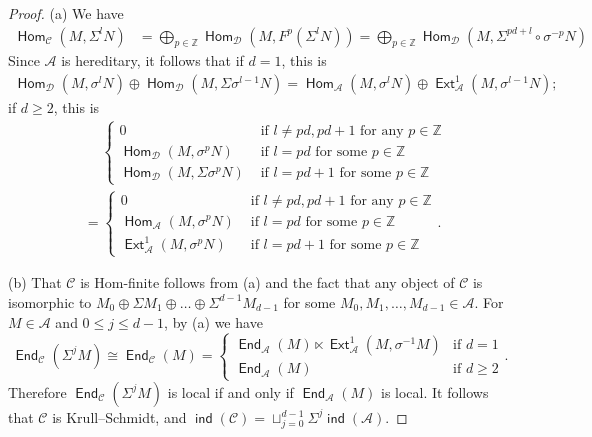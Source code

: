 \documentclass[reqno,12pt,a4paper]{amsart}
\theoremstyle{remark}
\theoremstyle{definition}
\newcommand{\opname}[1]{\operatorname{\mathsf{#1}}}
\newcommand{\ind}{\opname{ind}}
\newcommand{\Hom}{\opname{Hom}}
\newcommand{\End}{\opname{End}}
\newcommand{\Ext}{\opname{Ext}}
\newcommand{\ca}{{\mathcal A}}
\newcommand{\cc}{{\mathcal C}}
\newcommand{\cd}{{\mathcal D}}
\numberwithin{equation}{section}
\begin{document}
\begin{proof}
(a) We have
\begin{align*}
\Hom_\cc(M,\Sigma^{l}N)&=\bigoplus_{p\in\mathbb{Z}}\Hom_\cd(M,F^p(\Sigma^{l}N))=\bigoplus_{p\in\mathbb{Z}}\Hom_\cd(M,\Sigma^{pd+l}\circ\sigma^{-p}N)
\end{align*}
Since $\ca$ is hereditary, it follows that if $d=1$, this is
\begin{align*}
\Hom_\cd(M,\sigma^l N)\oplus \Hom_\cd(M,\Sigma\sigma^{l-1}N)=\Hom_\ca(M,\sigma^l N)\oplus \Ext^1_\ca(M,\sigma^{l-1}N);
\end{align*}
if $d\geq 2$, this is
\begin{align*}
&\hspace{15pt}\begin{cases} 0 & \text{ if } l\neq pd, pd+1 \text{ for any }p\in\mathbb{Z}\\
\Hom_\cd(M,\sigma^{p}N) & \text{ if } l=pd \text{ for some }p\in\mathbb{Z}\\
\Hom_\cd(M,\Sigma \sigma^{p}N) & \text{ if }l=pd+1 \text{ for some }p\in\mathbb{Z}
\end{cases}\\
&=\begin{cases} 0 & \text{ if } l\neq pd, pd+1 \text{ for any }p\in\mathbb{Z}\\
\Hom_\ca(M,\sigma^{p}N) & \text{ if } l=pd \text{ for some }p\in\mathbb{Z}\\
\Ext^1_\ca(M,\sigma^{p}N) & \text{ if }l=pd+1 \text{ for some }p\in\mathbb{Z}
\end{cases}.
\end{align*}

(b) That $\cc$ is Hom-finite follows from (a) and the fact that any object of $\cc$ is isomorphic to $M_0\oplus \Sigma M_1\oplus\ldots\oplus \Sigma^{d-1}M_{d-1}$ for some $M_0,M_1,\ldots,M_{d-1}\in\ca$. For $M\in\ca$ and $0\leq j\leq d-1$, by (a) we have
\[
\End_\cc(\Sigma^j M)\cong\End_\cc(M)=\begin{cases} \End_\ca(M)\ltimes \Ext^1_\ca(M,\sigma^{-1}M) & \text{if }d=1\\
\End_\ca(M) & \text{if }d\geq 2
\end{cases}.
\]
Therefore $\End_\cc(\Sigma^j M)$ is local if and only if $\End_\ca(M)$ is local. It follows that $\cc$ is Krull--Schmidt, and $\ind(\cc)=\sqcup_{j=0}^{d-1}\Sigma^{j}\ind(\ca)$.


\end{proof}
\end{document}
